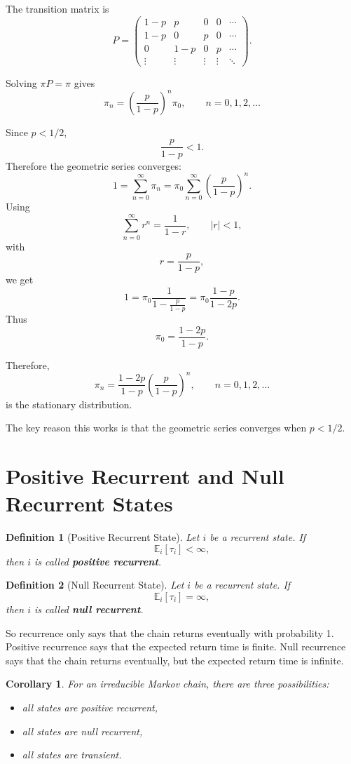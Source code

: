 \documentclass[12pt,a4paper]{article}
\theoremstyle{lecturestyle}
\newtheorem{definition}{Definition}
\newtheorem{corollary}{Corollary}
\newcommand{\E}{\mathbb{E}}
\begin{document}
The transition matrix is
\[
P=
\begin{pmatrix}
1-p & p & 0 & 0 & \cdots\\
1-p & 0 & p & 0 & \cdots\\
0 & 1-p & 0 & p & \cdots\\
\vdots & \vdots & \vdots & \vdots & \ddots
\end{pmatrix}.
\]

Solving $\pi P=\pi$ gives
\[
\pi_n=
\left(\frac{p}{1-p}\right)^n\pi_0,
\qquad n=0,1,2,\ldots
\]

Since $p<1/2$,
\[
\frac{p}{1-p}<1.
\]
Therefore the geometric series converges:
\[
1
=
\sum_{n=0}^{\infty}\pi_n
=
\pi_0\sum_{n=0}^{\infty}\left(\frac{p}{1-p}\right)^n.
\]
Using
\[
\sum_{n=0}^{\infty}r^n=\frac{1}{1-r}, \qquad |r|<1,
\]
with
\[
r=\frac{p}{1-p},
\]
we get
\[
1
=
\pi_0\frac{1}{1-\frac{p}{1-p}}
=
\pi_0\frac{1-p}{1-2p}.
\]
Thus
\[
\pi_0=\frac{1-2p}{1-p}.
\]

Therefore,
\[
\boxed{
\pi_n=
\frac{1-2p}{1-p}
\left(\frac{p}{1-p}\right)^n,
\qquad n=0,1,2,\ldots
}
\]
is the stationary distribution.

The key reason this works is that the geometric series converges when $p<1/2$.

\section{Positive Recurrent and Null Recurrent States}

\begin{definition}[Positive Recurrent State]
Let $i$ be a recurrent state. If
\[
\E_i[\tau_i]<\infty,
\]
then $i$ is called \textbf{positive recurrent}.
\end{definition}

\begin{definition}[Null Recurrent State]
Let $i$ be a recurrent state. If
\[
\E_i[\tau_i]=\infty,
\]
then $i$ is called \textbf{null recurrent}.
\end{definition}

So recurrence only says that the chain returns eventually with probability 1. Positive recurrence says that the expected return time is finite. Null recurrence says that the chain returns eventually, but the expected return time is infinite.

\begin{corollary}
For an irreducible Markov chain, there are three possibilities:
\begin{itemize}[leftmargin=1.2cm]
    \item all states are positive recurrent,
    \item all states are null recurrent,
    \item all states are transient.
\end{itemize}
\end{corollary}
\end{document}
